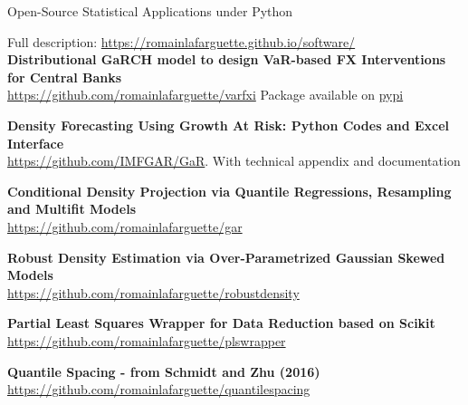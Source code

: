 \documentclass[usegeometry, 10pt, a4paper]{cv} %
\newcommand{\activite}[1]{\textbf{#1}\ }
\begin{document}
\newpage



\begin{rubriquetableau}[0.95\textwidth]{Open-Source Statistical Applications under Python}\\
  \vspace{-0.5cm}
  
Full description: \url{https://romainlafarguette.github.io/software/}\\

\small
\activite{Distributional GaRCH model to design VaR-based FX Interventions for Central Banks} \\
\hspace{0.6cm} \small{\url{https://github.com/romainlafarguette/varfxi}} Package available on \href{https://pypi.org/project/varfxi/}{pypi}
\vspace{0.4cm} 

\small
\activite{Density Forecasting Using Growth At Risk: Python Codes and Excel Interface} \\
\hspace{0.6cm} \small{\url{https://github.com/IMFGAR/GaR}. With technical
  appendix and documentation}
\vspace{0.4cm} 

\small
\activite{Conditional Density Projection via Quantile Regressions, Resampling and Multifit Models} \\
\hspace{0.6cm} \small{\url{https://github.com/romainlafarguette/gar}}
\vspace{0.4cm} 

\small
\activite{Robust Density Estimation via Over-Parametrized Gaussian Skewed Models} \\
\hspace{0.6cm} \small{\url{https://github.com/romainlafarguette/robustdensity}}
\vspace{0.4cm} 

\small
\activite{Partial Least Squares Wrapper for Data Reduction based on Scikit} \\
\hspace{0.6cm} \small{\url{https://github.com/romainlafarguette/plswrapper}}
\vspace{0.4cm} 

\small
\activite{Quantile Spacing - from Schmidt and Zhu (2016)} \\
\hspace{0.6cm} \small{\url{https://github.com/romainlafarguette/quantilespacing}}
\vspace{0.4cm} 


\end{rubriquetableau}
\end{document}
